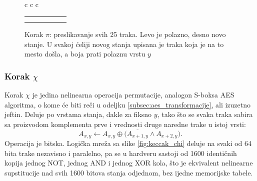 \begin{figure}[H]
{{\begin{tabular}{c c c}
\begin{tabular}{|c|c|c|c|c|c|}
    \hline
    \cellcolor{gray!30}\kv{$y{=}2$} & \cellcolor{green!30}\kv{$A_{1,0}$} & \cellcolor{yellow!30}\kv{$A_{2,1}$} & \cellcolor{cyan!30}\kv{$A_{3,2}$} & \cellcolor{purple!30}\kv{$A_{4,3}$} & \cellcolor{orange!30}\kv{$A_{0,4}$} \\
    \hline
    \cellcolor{gray!30}\kv{$y{=}3$} & \cellcolor{green!30}\kv{$A_{4,0}$} & \cellcolor{yellow!30}\kv{$A_{0,1}$} & \cellcolor{cyan!30}\kv{$A_{1,2}$} & \cellcolor{purple!30}\kv{$A_{2,3}$} & \cellcolor{orange!30}\kv{$A_{3,4}$} \\
    \hline
    \cellcolor{gray!30}\kv{$y{=}4$} & \cellcolor{green!30}\kv{$A_{2,0}$} & \cellcolor{yellow!30}\kv{$A_{3,1}$} & \cellcolor{cyan!30}\kv{$A_{4,2}$} & \cellcolor{purple!30}\kv{$A_{0,3}$} & \cellcolor{orange!30}\kv{$A_{1,4}$} \\
    \hline
    \end{tabular}
\end{tabular}
}
}
\caption[Korak $\pi$: preslikavanje svih 25 traka]{Korak $\pi$: preslikavanje svih 25 traka. Levo je polazno, desno novo stanje. U svakoj ćeliji novog stanja upisana je traka koja je na to mesto došla, a boja prati polaznu vrstu $y$}
\label{fig:keccak_pi}
\end{figure}

\subsubsection{Korak \texorpdfstring{$\chi$}{chi}}

Korak $\chi$ je jedina nelinearna operacija permutacije, analogon S-boksa AES algoritma, o kome će biti reči u odeljku \ref{subsec:aes_transformacije}, ali izuzetno jeftin. Deluje po vrstama stanja, dakle za fiksno $y$, tako što se svaka traka sabira sa proizvodom komplementa prve i vrednosti druge naredne trake u istoj vrsti:
\begin{equation}
    A_{x,y} \gets A_{x,y} \oplus \big(\overline{A_{x+1,y}} \wedge A_{x+2,y}\big).
\end{equation}
Operacija je bitska. Logička mreža sa slike \ref{fig:keccak_chi} deluje na svaki od 64 bita trake nezavisno i paralelno, pa se u hardveru sastoji od 1600 identičnih kopija jednog NOT, jednog AND i jednog XOR kola, što je ekvivalent nelinearne supstitucije nad svih 1600 bitova stanja odjednom, bez ijedne memorijske tabele.

